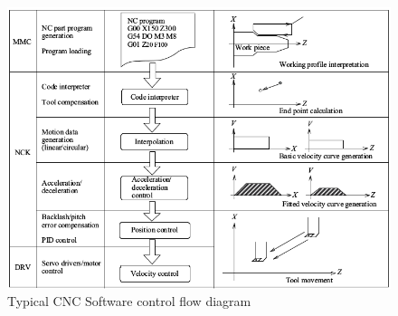 \begin{figure}
	\caption{Typical CNC Software control flow diagram}
    \label{CNC-Typical-Software-Control-Flow-Diagram.png}	
	\includegraphics[width=1.00\textwidth]{Chap2/Images/CNC-Typical-Software-Control-Flow-Diagram.png} 
\end{figure}

\clearpage
\pagebreak

